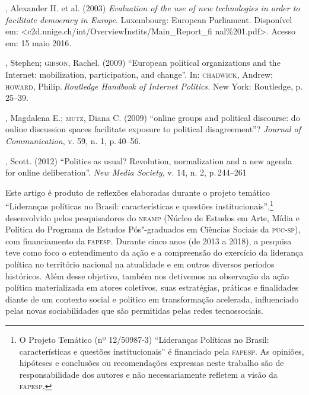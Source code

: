 \begin{bibliohedra}
, Alexander H. et al. (2003) \emph{Evaluation of the use of new
technologies in order to facilitate democracy in Europe}. Luxembourg:
European Parliament. Disponível em:
\textless{}c2d.unige.ch/int/OverviewInstits/Main\_Report\_fi
nal\%201.pdf\textgreater{}. Acesso em: 15 maio 2016.

, Stephen; \textsc{gibson}, Rachel. (2009) ``European political organizations
and the Internet: mobilization, participation, and change''. In:
\textsc{chadwick}, Andrew; \textsc{howard}, Philip.\,\emph{Routledge Handbook of Internet
Politics.} New York: Routledge, p.\,25--39.

, Magdalena E.; \textsc{mutz}, Diana C. (2009) ``online groups and
political discourse: do online discussion spaces facilitate exposure to
political disagreement''? \emph{Journal of Communication}, v. 59, n. 1,
p.\,40--56.

, Scott. (2012) ``Politics as usual? Revolution, normalization and
a new agenda for online deliberation''. \emph{New Media Society}, v.
14, n. 2, p.\,244--261
\end{bibliohedra}




\noindent{}Este artigo é produto de reflexões elaboradas durante o projeto temático
``Lideranças políticas no Brasil: características e questões
institucionais'',\footnote{O Projeto Temático (nº 12/50987-3)
  ``Lideranças Políticas no Brasil: características e questões
  institucionais'' é financiado pela \textsc{fapesp}. As opiniões, hipóteses e
  conclusões ou recomendações expressas neste trabalho são de
  responsabilidade dos autores e não necessariamente refletem a visão da
  \textsc{fapesp}.} desenvolvido pelos pesquisadores do \textsc{neamp} (Núcleo de Estudos
em Arte, Mídia e Política do Programa de Estudos Pós"-graduados em
Ciências Sociais da \textsc{puc}-\textsc{sp}), com financiamento da \textsc{fapesp}. Durante cinco
anos (de 2013 a 2018), a pesquisa teve como foco o entendimento da ação
e a compreensão do exercício da liderança política no território
nacional na atualidade e em outros diversos períodos históricos. Além
desse objetivo, também nos detivemos na observação da ação política
materializada em atores coletivos, suas estratégias, práticas e
finalidades diante de um contexto social e político em transformação
acelerada, influenciado pelas novas sociabilidades que são permitidas
pelas redes tecnossociais.

